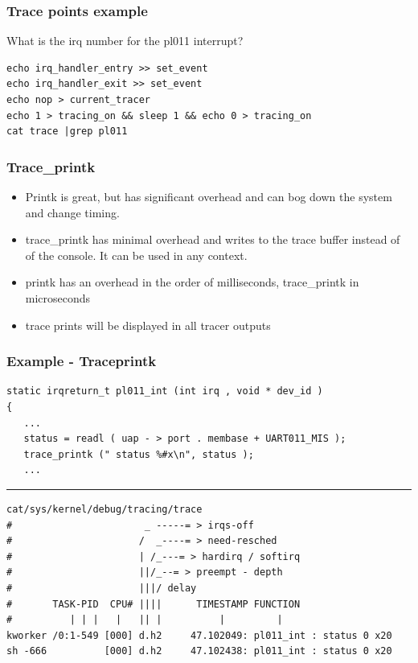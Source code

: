 \documentclass{beamer}
\begin{document}
\begin{frame}[fragile]
\frametitle{Trace points example}
What is the irq number for the pl011 interrupt?
\begin{verbatim}
echo irq_handler_entry >> set_event
echo irq_handler_exit >> set_event
echo nop > current_tracer
echo 1 > tracing_on && sleep 1 && echo 0 > tracing_on
cat trace |grep pl011
\end{verbatim}
\end{frame}

\begin{frame}
\frametitle{Trace\_printk}
\begin{itemize}
	\item Printk is great, but has significant overhead and can bog down the system and change timing.
	\item trace\_printk has minimal overhead and writes to the trace buffer instead of of the console. It can be used in any context.
	\item printk has an overhead in the order of milliseconds, trace\_printk in microseconds
	\item trace prints will be displayed in all tracer outputs
\end{itemize}
\end{frame}

\begin{frame}[fragile]
\frametitle{Example - Traceprintk}
\tiny
\begin{verbatim}
static irqreturn_t pl011_int (int irq , void * dev_id )
{
   ...
   status = readl ( uap - > port . membase + UART011_MIS );
   trace_printk (" status %#x\n", status );
   ...
\end{verbatim}
\noindent\rule[0.5ex]{\linewidth}{1pt}
\begin{verbatim}
cat/sys/kernel/debug/tracing/trace
#                       _ -----= > irqs-off
#                      /  _----= > need-resched
#                      | /_---= > hardirq / softirq
#                      ||/_--= > preempt - depth
#                      |||/ delay
#       TASK-PID  CPU# ||||      TIMESTAMP FUNCTION
#          | | |   |   || |          |         |
kworker /0:1-549 [000] d.h2     47.102049: pl011_int : status 0 x20
sh -666          [000] d.h2     47.102438: pl011_int : status 0 x20
\end{verbatim}
\end{frame}
\end{document}
